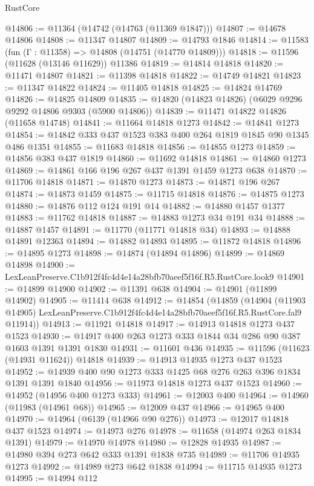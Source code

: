 \begin{lexlean}{RustCore}
\begin{coremodule}
@14806 := @11364 (@14742 (@14763 (@11369 @1847)))
@14807 := @14678 @14806
@14808 := @11347 @14807
@14809 := @14793 @1846
@14814 := @11583 (fun (Γ : @11358) => @14808 (@14751 (@14770 @14809)))
@14818 := @11596 (@11628 (@13146 @11629)) @11386
@14819 := @14814 @14818
@14820 := @11471 @14807
@14821 := @11398 @14818
@14822 := @14749 @14821
@14823 := @11347 @14822
@14824 := @11405 @14818
@14825 := @14824 @14769
@14826 := @14825 @14809
@14835 := @14820 (@14823 @14826) (@6029 @9296 @9292 @14806 @9303 (@5900 @14806))
@14839 := @11471 @14822 @14826 (@11658 @14748)
@14841 := @11664 @14818 @1273
@14842 := @14841 @1273
@14854 := @14842 @333 @437 @1523 @383 @400 @264 @1819 @1845 @90 @1345 @486 @1351
@14855 := @11683 @14818
@14856 := @14855 @1273
@14859 := @14856 @383 @437 @1819
@14860 := @11692 @14818
@14861 := @14860 @1273
@14869 := @14861 @166 @196 @267 @437 @1391 @1459 @1273 @638
@14870 := @11706 @14818
@14871 := @14870 @1273
@14873 := @14871 @196 @267
@14874 := @14873 @1459
@14875 := @11715 @14818
@14876 := @14875 @1273
@14880 := @14876 @112 @124 @191 @14
@14882 := @14880 @1457 @1377
@14883 := @11762 @14818
@14887 := @14883 @1273 @34 @191 @34
@14888 := @14887 @1457
@14891 := @11770 (@11771 @14818 @34)
@14893 := @14888 @14891 @12363
@14894 := @14882 @14893
@14895 := @11872 @14818
@14896 := @14895 @1273
@14898 := @14874 (@14894 @14896)
@14899 := @14869 @14898
@14900 := LexLeanPreserve.C1b912f4fc4d4e14a28bfb70aeef5f16f.R5.RustCore.look9
@14901 := @14899 @14900
@14902 := @11391 @638
@14904 := @14901 (@11899 @14902)
@14905 := @11414 @638
@14912 := @14854
    (@14859
      (@14904
        (@11903 @14905)
        LexLeanPreserve.C1b912f4fc4d4e14a28bfb70aeef5f16f.R5.RustCore.fal9
        @11914))
@14913 := @11921 @14818
@14917 := @14913 @14818 @1273 @437 @1523
@14930 := @14917 @400 @263 @1273 @333 @1844 @34 @286 @90 @387 @1603 @1391 @1391 @1830
@14931 := @11601 @436
@14935 := @11596 (@11623 (@14931 @11624)) @14818
@14939 := @14913 @14935 @1273 @437 @1523
@14952 := @14939 @400 @90 @1273 @333 @1425 @68 @276 @263 @396 @1834 @1391 @1391 @1840
@14956 := @11973 @14818 @1273 @437 @1523
@14960 := @14952 (@14956 @400 @1273 @333)
@14961 := @12003 @400
@14964 := @14960 (@11983 (@14961 @68))
@14965 := @12009 @437
@14966 := @14965 @400
@14970 := @14964 (@6139 (@14966 @90 @276))
@14973 := @12017 @14818 @437 @1523
@14974 := @14973 @276
@14978 := @11658 (@14974 @263 @1834 @1391)
@14979 := @14970 @14978
@14980 := @12828 @14935
@14987 := @14980 @394 @273 @642 @333 @1391 @1838 @735
@14989 := @11706 @14935 @1273
@14992 := @14989 @273 @642 @1838
@14994 := @11715 @14935 @1273
@14995 := @14994 @112

\end{coremodule}
\end{lexlean}
